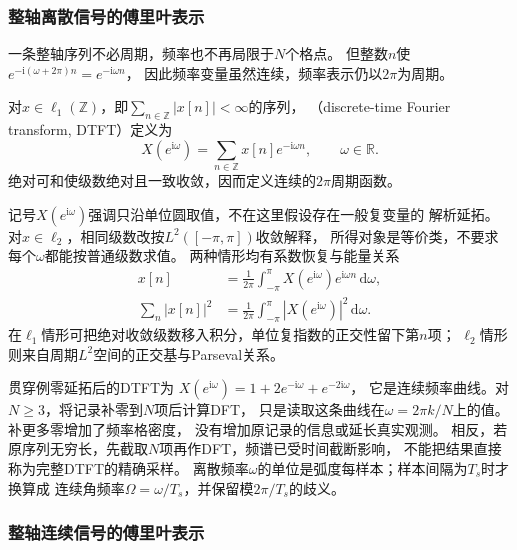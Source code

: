 \subsubsection{整轴离散信号的傅里叶表示}

一条整轴序列不必周期，频率也不再局限于$N$个格点。
但整数$n$使$e^{-\mathrm i(\omega+2\pi)n}=e^{-\mathrm i\omega n}$，
因此频率变量虽然连续，频率表示仍以$2\pi$为周期。
\begin{definition}[离散时间傅里叶变换]
  \label{def:signal-analysis-dtft}
  对$x\in\ell_1(\mathbb Z)$，即$\sum_{n\in\mathbb Z}|x[n]|<\infty$的序列，
  （discrete-time Fourier transform, DTFT）定义为
  \begin{equation}
    X(e^{\mathrm i\omega})=\sum_{n\in\mathbb Z}x[n]e^{-\mathrm i\omega n},
    \qquad \omega\in\mathbb R.
    \label{eq:signal-analysis-dtft}
  \end{equation}
  绝对可和使级数绝对且一致收敛，因而定义连续的$2\pi$周期函数。
\end{definition}
记号$X(e^{\mathrm i\omega})$强调只沿单位圆取值，不在这里假设存在一般复变量的
解析延拓。对$x\in\ell_2$，相同级数改按$L^2([-\pi,\pi])$收敛解释，
所得对象是等价类，不要求每个$\omega$都能按普通级数求值。
两种情形均有系数恢复与能量关系
\begin{align*}
  x[n]&=\frac1{2\pi}\int_{-\pi}^{\pi}
  X(e^{\mathrm i\omega})e^{\mathrm i\omega n}\,\mathrm d\omega,\\
  \sum_n|x[n]|^2&=\frac1{2\pi}\int_{-\pi}^{\pi}|X(e^{\mathrm i\omega})|^2\,\mathrm d\omega.
\end{align*}
在$\ell_1$情形可把绝对收敛级数移入积分，单位复指数的正交性留下第$n$项；
$\ell_2$情形则来自周期$L^2$空间的正交基与Parseval关系。

贯穿例零延拓后的DTFT为
$X(e^{\mathrm i\omega})=1+2e^{-\mathrm i\omega}+e^{-2\mathrm i\omega}$，
它是连续频率曲线。对$N\geq3$，将记录补零到$N$项后计算DFT，
只是读取这条曲线在$\omega=2\pi k/N$上的值。补更多零增加了频率格密度，
没有增加原记录的信息或延长真实观测。
相反，若原序列无穷长，先截取$N$项再作DFT，频谱已受时间截断影响，
不能把结果直接称为完整DTFT的精确采样。
离散频率$\omega$的单位是弧度每样本；样本间隔为$T_s$时才换算成
连续角频率$\Omega=\omega/T_s$，并保留模$2\pi/T_s$的歧义。

\subsubsection{整轴连续信号的傅里叶表示}

